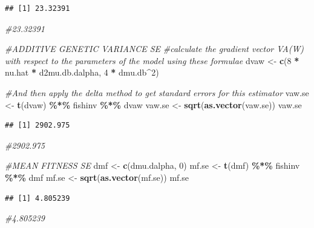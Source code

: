 \documentclass[
]{article}
\newenvironment{Shaded}{\begin{snugshade}}{\end{snugshade}}
\newcommand{\CommentTok}[1]{\textcolor[rgb]{0.56,0.35,0.01}{\textit{#1}}}
\newcommand{\DecValTok}[1]{\textcolor[rgb]{0.00,0.00,0.81}{#1}}
\newcommand{\FunctionTok}[1]{\textcolor[rgb]{0.13,0.29,0.53}{\textbf{#1}}}
\newcommand{\NormalTok}[1]{#1}
\newcommand{\OtherTok}[1]{\textcolor[rgb]{0.56,0.35,0.01}{#1}}
\newcommand{\SpecialCharTok}[1]{\textcolor[rgb]{0.81,0.36,0.00}{\textbf{#1}}}
\begin{document}
\begin{verbatim}
## [1] 23.32391
\end{verbatim}

\begin{Shaded}
\begin{Highlighting}[]
\CommentTok{\#23.32391}

\CommentTok{\#ADDITIVE GENETIC VARIANCE SE }
\CommentTok{\#calculate the gradient vector VA(W) with respect to the parameters of the model using these formulae}
\NormalTok{dvaw }\OtherTok{\textless{}{-}} \FunctionTok{c}\NormalTok{(}\DecValTok{8} \SpecialCharTok{*}\NormalTok{ nu.hat }\SpecialCharTok{*}\NormalTok{ d2mu.db.dalpha, }\DecValTok{4} \SpecialCharTok{*}\NormalTok{ dmu.db}\SpecialCharTok{\^{}}\DecValTok{2}\NormalTok{)}

\CommentTok{\#And then apply the delta method to get standard errors for this estimator}
\NormalTok{vaw.se }\OtherTok{\textless{}{-}} \FunctionTok{t}\NormalTok{(dvaw) }\SpecialCharTok{\%*\%}\NormalTok{ fishinv }\SpecialCharTok{\%*\%}\NormalTok{ dvaw}
\NormalTok{vaw.se }\OtherTok{\textless{}{-}} \FunctionTok{sqrt}\NormalTok{(}\FunctionTok{as.vector}\NormalTok{(vaw.se))}
\NormalTok{vaw.se}
\end{Highlighting}
\end{Shaded}

\begin{verbatim}
## [1] 2902.975
\end{verbatim}

\begin{Shaded}
\begin{Highlighting}[]
\CommentTok{\#2902.975}

\CommentTok{\#MEAN FITNESS SE}
\NormalTok{dmf }\OtherTok{\textless{}{-}} \FunctionTok{c}\NormalTok{(dmu.dalpha, }\DecValTok{0}\NormalTok{)}
\NormalTok{mf.se }\OtherTok{\textless{}{-}} \FunctionTok{t}\NormalTok{(dmf) }\SpecialCharTok{\%*\%}\NormalTok{ fishinv }\SpecialCharTok{\%*\%}\NormalTok{ dmf}
\NormalTok{mf.se }\OtherTok{\textless{}{-}} \FunctionTok{sqrt}\NormalTok{(}\FunctionTok{as.vector}\NormalTok{(mf.se))}
\NormalTok{mf.se}
\end{Highlighting}
\end{Shaded}

\begin{verbatim}
## [1] 4.805239
\end{verbatim}

\begin{Shaded}
\begin{Highlighting}[]
\CommentTok{\#4.805239}
\end{Highlighting}
\end{Shaded}
\end{document}
